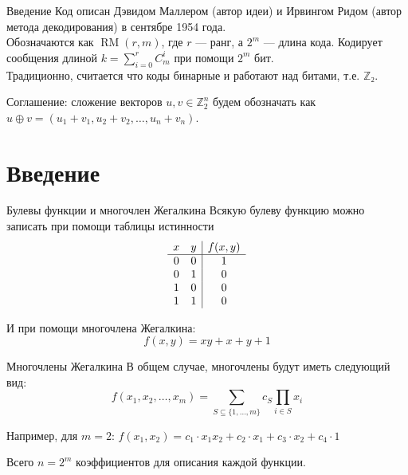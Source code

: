 \documentclass[
    articleoptions={12pt,a4paper,oneside},
]{beamerswitch}
\DeclareMathOperator{\RM}{RM}
\newcommand{\n}{\\}
\newcommand{\n}{ }
\begin{document}
\begin{frame}{Введение}
    Код описан Дэвидом Маллером (автор идеи) и Ирвингом Ридом (автор метода декодирования) в сентябре 1954 года.\n
    Обозначаются как $\RM(r, m)$, где $r$ — ранг, а $2^m$ — длина кода. Кодирует сообщения длиной $k = \sum_{i=0}^{r} C_m^i$ при помощи $2^m$ бит. \n
    Традиционно, считается что коды бинарные и работают над битами, т.е. $ℤ₂$.
    
    Соглашение: сложение векторов $u, v ∈ ℤ_2^n$ будем обозначать как $u ⊕ v = (u_1 + v_1, u_2 + v_2, …, u_n + v_n)$.
\end{frame}

\section{Введение}
\begin{frame}{Булевы функции и многочлен Жегалкина}
    Всякую булеву функцию можно записать при помощи таблицы истинности
    \[
        \begin{array}{cc | c}
            x & y & f(x, y) \\\hline
            0 & 0 & 1 \\
            0 & 1 & 0 \\
            1 & 0 & 0 \\
            1 & 1 & 0
        \end{array}
    \]

    И при помощи многочлена Жегалкина:
    \[
        f(x, y) = xy + x + y + 1
    \]
\end{frame}

\begin{frame}{Многочлены Жегалкина}
    В общем случае, многочлены будут иметь следующий вид:
    \[
        f(x_1, x_2, …, x_m) = \sum_{S ⊆ \{1, …, m\}} c_S \prod_{i ∈ S} x_i
    \]

    Например, для $m = 2$: $ f(x_1, x_2) = c_1 \cdot x_1x_2 + c_2 \cdot x_1 + c_3 \cdot x_2 + c_4\cdot1$
    
    Всего $n = 2^m$ коэффициентов для описания каждой функции.
\end{frame}
\end{document}
